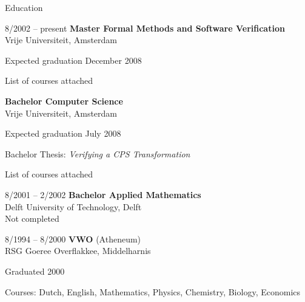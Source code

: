 \documentclass[a4paper,11pt]{article}
\newenvironment{sublist}{%
  \begin{list}{}{%
      \setlength{\itemsep}{0em}\setlength{\parsep}{0em}%
      \setlength{\topsep}{0em}\setlength{\parskip}{0em}%
    }%
}%
{ \end{list} }
\begin{document}
\begin{cv}{}
\begin{cvlist}{Education}
\item[8/2002 -- present]
  {\bf Master Formal Methods and Software Verification}\\
  Vrije Universiteit, Amsterdam
  \begin{sublist}
  \item Expected graduation December 2008
  \item List of courses attached
  \end{sublist}
  {\bf Bachelor Computer Science}\\
  Vrije Universiteit, Amsterdam
  \begin{sublist}
  \item Expected graduation July 2008
  \item Bachelor Thesis: \textit{Verifying a CPS Transformation}
  \item List of courses attached
  \end{sublist}
\item[8/2001 -- 2/2002]
  {\bf Bachelor Applied Mathematics}\\
  Delft University of Technology, Delft\\
  Not completed
\item[8/1994 -- 8/2000]
  {\bf VWO} (Atheneum)\\
  RSG Goeree Overflakkee,  Middelharnis
  \begin{sublist}
    \item Graduated 2000
    \item Courses: Dutch, English, Mathematics, Physics, Chemistry, Biology, Economics
  \end{sublist}
\end{cvlist}



\end{cv}
\end{document}
